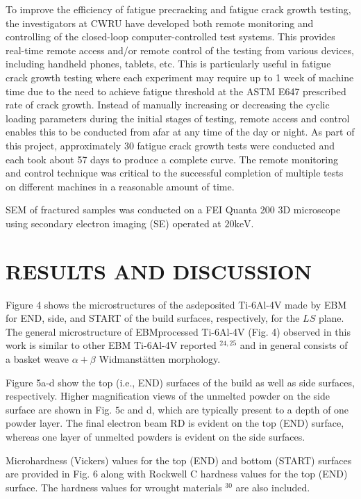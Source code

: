 \documentclass[10pt]{article}
\begin{document}
To improve the efficiency of fatigue precracking and fatigue crack growth testing, the investigators at CWRU have developed both remote monitoring and controlling of the closed-loop computer-controlled test systems. This provides real-time remote access and/or remote control of the testing from various devices, including handheld phones, tablets, etc. This is particularly useful in fatigue crack growth testing where each experiment may require up to 1 week of machine time due to the need to achieve fatigue threshold at the ASTM E647 prescribed rate of crack growth. Instead of manually increasing or decreasing the cyclic loading parameters during the initial stages of testing, remote access and control enables this to be conducted from afar at any time of the day or night. As part of this project, approximately 30 fatigue crack growth tests were conducted and each took about 57 days to produce a complete curve. The remote monitoring and control technique was critical to the successful completion of multiple tests on different machines in a reasonable amount of time.

SEM of fractured samples was conducted on a FEI Quanta 200 3D microscope using secondary electron imaging (SE) operated at $20 \mathrm{keV}$.

\section*{RESULTS AND DISCUSSION}
Figure 4 shows the microstructures of the asdeposited Ti-6Al-4V made by EBM for END, side, and START of the build surfaces, respectively, for the $L S$ plane. The general microstructure of EBMprocessed Ti-6Al-4V (Fig. 4) observed in this work is similar to other EBM Ti-6Al-4V reported ${ }^{24,25}$ and in general consists of a basket weave $\alpha+\beta$ Widmanstätten morphology.

Figure 5a-d show the top (i.e., END) surfaces of the build as well as side surfaces, respectively. Higher magnification views of the unmelted powder on the side surface are shown in Fig. $5 \mathrm{c}$ and d, which are typically present to a depth of one powder layer. The final electron beam RD is evident on the top (END) surface, whereas one layer of unmelted powders is evident on the side surfaces.

Microhardness (Vickers) values for the top (END) and bottom (START) surfaces are provided in Fig. 6 along with Rockwell $\mathrm{C}$ hardness values for the top (END) surface. The hardness values for wrought materials ${ }^{30}$ are also included.
\end{document}
